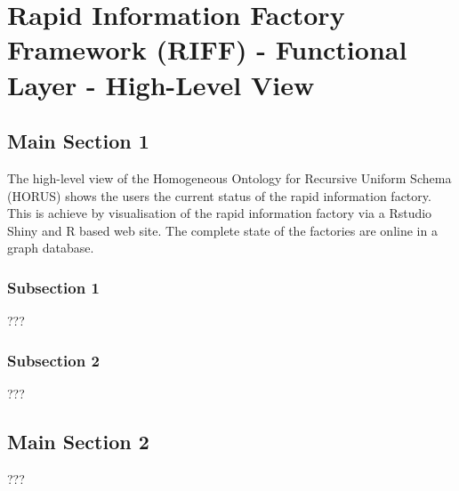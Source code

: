 
\chapter{Rapid Information Factory Framework (RIFF) - Functional Layer - High-Level View} %

\label{Chapter06} %



\section{Main Section 1}

The high-level view of the Homogeneous Ontology for Recursive Uniform Schema (HORUS) shows the users the current status of the rapid information factory. This is achieve by visualisation of the rapid information factory via a Rstudio Shiny \cite{ortega2013combining} and R \cite{team2000r} based web site. The complete state of the factories are online in a graph database.

\subsection{Subsection 1}

???


\subsection{Subsection 2}

???


\section{Main Section 2}

???

